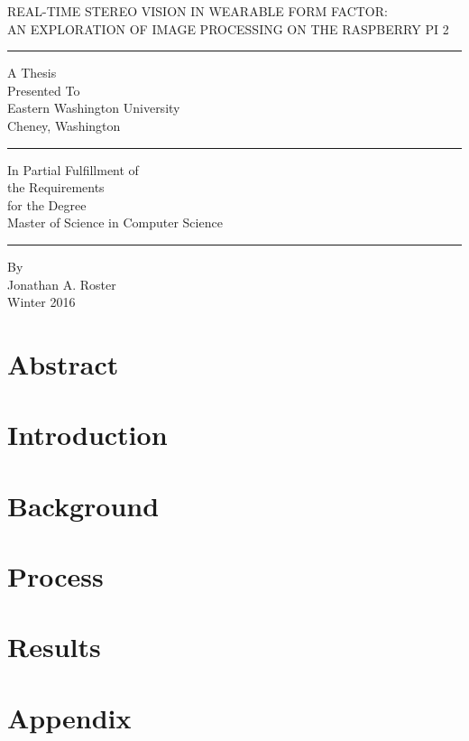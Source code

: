 \documentclass[12]{report}
\begin{document}
\doublespace
\begin{center}
	REAL-TIME STEREO VISION IN WEARABLE FORM FACTOR:\\ AN EXPLORATION OF IMAGE PROCESSING ON THE RASPBERRY PI 2
\end{center}
\hrule
\begin{center}
	A Thesis\\
	Presented To\\
	Eastern Washington University\\
	Cheney, Washington\\
\end{center}
\hrule
\begin{center}
	In Partial Fulfillment of \\
	the Requirements\\
	for the Degree \\
	Master of Science in Computer Science\\
\end{center}
	\hrule
\begin{center}
	By \\
	Jonathan A. Roster\\
	Winter 2016
\end{center}


\tableofcontents
\chapter*{Abstract}


\chapter*{Introduction}


\chapter*{Background}


\chapter*{Process}



\chapter*{Results}


\appendix
\chapter*{Appendix}

\end{document}
